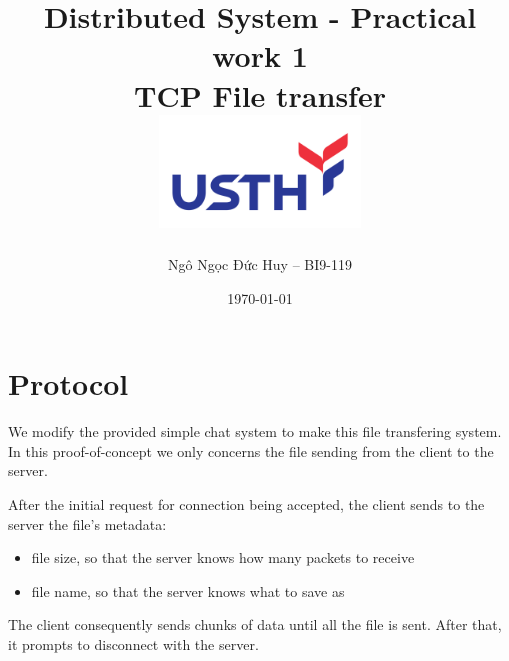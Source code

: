 \documentclass{article}
\begin{document}
\begin{titlepage}
	\title{
		\Large{Distributed System - Practical work 1} \\
		\Huge{\textbf{TCP File transfer}} \\
		\includegraphics[width=0.4\textwidth]{logo-usth-pa3-01.png}
	}
	\author{
		 Ngô Ngọc Đức Huy -- BI9-119 \\
	}
	\date{\today}
\end{titlepage}

\maketitle

\section{Protocol}

We modify the provided simple chat system to make this file transfering system.
In this proof-of-concept we only concerns the file sending from the client to the server.

After the initial request for connection being accepted, the client sends to the server
the file's metadata:

\begin{itemize}
	\item file size, so that the server knows how many packets to receive
	\item file name, so that the server knows what to save as
\end{itemize}

The client consequently sends chunks of data until all the file is sent.
After that, it prompts to disconnect with the server.
\end{document}

